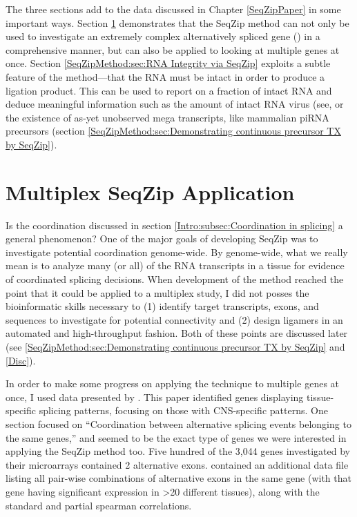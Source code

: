  The three sections add to the data discussed in Chapter \ref{SeqZipPaper} in some important ways. Section \ref{SeqZipMethod:sec:Multiplex Gene Study} demonstrates that the SeqZip method can not only be used to investigate an extremely complex alternatively spliced gene (\dscam{}) in a comprehensive manner, but can also be applied to looking at multiple genes at once. Section \ref{SeqZipMethod:sec:RNA Integrity via SeqZip} exploits a subtle feature of the method---that the RNA must be intact in order to produce a ligation product. This can be used to report on a fraction of intact RNA and deduce meaningful information such as the amount of intact RNA virus (see, or the existence of as-yet unobserved mega transcripts, like mammalian piRNA precursors (section \ref{SeqZipMethod:sec:Demonstrating continuous precursor TX by SeqZip}).

\section{Multiplex SeqZip Application}
  \label{SeqZipMethod:sec:Multiplex Gene Study}

  Is the coordination discussed in section \ref{Intro:subsec:Coordination in splicing} a general phenomenon? One of the major goals of developing SeqZip was to investigate potential coordination genome-wide. By genome-wide, what we really mean is to analyze many (or all) of the RNA transcripts in a tissue for evidence of coordinated splicing decisions. When development of the method reached the point that it could be applied to a multiplex study, I did not posses the bioinformatic skills necessary to (1) identify target transcripts, exons, and sequences to investigate for potential connectivity and (2) design ligamers in an automated and high-throughput fashion. Both of these points are discussed later (see \ref{SeqZipMethod:sec:Demonstrating continuous precursor TX by SeqZip} and \ref{Disc}). 

  In order to make some progress on applying the technique to multiple genes at once, I used data presented by \citet{Fagnani2007}. This paper identified genes displaying tissue-specific splicing patterns, focusing on those with CNS-specific patterns. One section focused on ``Coordination between alternative splicing events belonging to the same genes,'' and seemed to be the exact type of genes we were interested in applying the SeqZip method too. Five hundred of the 3,044 genes investigated by their microarrays contained 2 alternative exons. \citet{Fagnani2007} contained an additional data file listing all pair-wise combinations of alternative exons in the same gene (with that gene having significant expression in >20 different tissues), along with the standard and partial spearman correlations. 

